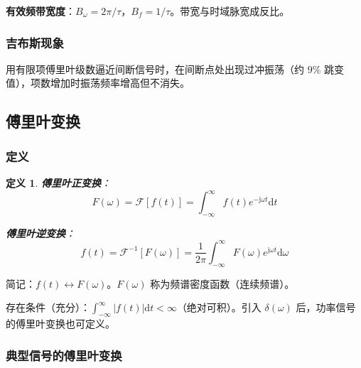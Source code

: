\documentclass[11pt,a4paper]{ctexart}
\newtheorem{definition}{定义}[section]
\newcommand{\FT}{\mathcal{F}}           %
\newcommand{\IFT}{\mathcal{F}^{-1}}     %
\newcommand{\jj}{\mathrm{j}}            %
\newcommand{\dd}{\mathrm{d}}            %
\newcommand{\dirac}{\delta}             %
\begin{document}
\textbf{有效频带宽度}：$B_\omega = 2\pi/\tau$，$B_f = 1/\tau$。带宽与时域脉宽成反比。

\subsubsection{吉布斯现象}
用有限项傅里叶级数逼近间断信号时，在间断点处出现过冲振荡（约 $9\%$ 跳变值），项数增加时振荡频率增高但不消失。

\subsection{傅里叶变换}

\subsubsection{定义}
\begin{definition}
\textbf{傅里叶正变换}：
\[
\boxed{F(\omega) = \FT[f(t)] = \int_{-\infty}^{\infty} f(t)e^{-\jj\omega t}\dd t}
\]

\textbf{傅里叶逆变换}：
\[
\boxed{f(t) = \IFT[F(\omega)] = \frac{1}{2\pi}\int_{-\infty}^{\infty} F(\omega)e^{\jj\omega t}\dd\omega}
\]
\end{definition}

简记：$f(t) \leftrightarrow F(\omega)$。$F(\omega)$ 称为频谱密度函数（连续频谱）。

存在条件（充分）：$\int_{-\infty}^{\infty}|f(t)|\dd t < \infty$（绝对可积）。引入 $\dirac(\omega)$ 后，功率信号的傅里叶变换也可定义。

\subsubsection{典型信号的傅里叶变换}
\end{document}
